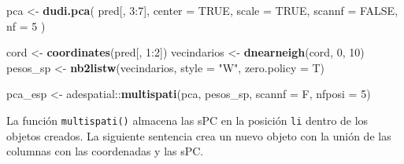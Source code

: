 \documentclass[11pt,b5paper,]{krantz}
\newenvironment{Shaded}{}{}
\newcommand{\CommentTok}[1]{\textcolor[rgb]{0.38,0.63,0.69}{\textit{#1}}}
\newcommand{\DataTypeTok}[1]{\textcolor[rgb]{0.56,0.13,0.00}{#1}}
\newcommand{\DecValTok}[1]{\textcolor[rgb]{0.25,0.63,0.44}{#1}}
\newcommand{\KeywordTok}[1]{\textcolor[rgb]{0.00,0.44,0.13}{\textbf{#1}}}
\newcommand{\NormalTok}[1]{#1}
\newcommand{\OperatorTok}[1]{\textcolor[rgb]{0.40,0.40,0.40}{#1}}
\newcommand{\OtherTok}[1]{\textcolor[rgb]{0.00,0.44,0.13}{#1}}
\newcommand{\StringTok}[1]{\textcolor[rgb]{0.25,0.44,0.63}{#1}}
\begin{document}
\begin{Shaded}
\begin{Highlighting}[]
\NormalTok{pca <-}
\StringTok{  }\KeywordTok{dudi.pca}\NormalTok{(}
\NormalTok{    pred[, }\DecValTok{3}\OperatorTok{:}\DecValTok{7}\NormalTok{],}
    \DataTypeTok{center =} \OtherTok{TRUE}\NormalTok{,}
    \DataTypeTok{scale =} \OtherTok{TRUE}\NormalTok{,}
    \DataTypeTok{scannf =} \OtherTok{FALSE}\NormalTok{,}
    \DataTypeTok{nf =} \DecValTok{5}
\NormalTok{  )}

\NormalTok{cord <-}\StringTok{ }\KeywordTok{coordinates}\NormalTok{(pred[, }\DecValTok{1}\OperatorTok{:}\DecValTok{2}\NormalTok{])}
\NormalTok{vecindarios <-}\StringTok{ }\KeywordTok{dnearneigh}\NormalTok{(cord, }\DecValTok{0}\NormalTok{, }\DecValTok{10}\NormalTok{)}
\NormalTok{pesos_sp <-}\StringTok{ }\KeywordTok{nb2listw}\NormalTok{(vecindarios, }
                     \DataTypeTok{style =} \StringTok{"W"}\NormalTok{, }
                     \DataTypeTok{zero.policy =}\NormalTok{ T)}

\NormalTok{pca_esp <-}
\StringTok{  }\NormalTok{adespatial}\OperatorTok{::}\KeywordTok{multispati}\NormalTok{(pca, pesos_sp, }
                         \DataTypeTok{scannf =}\NormalTok{ F, }\DataTypeTok{nfposi =} \DecValTok{5}\NormalTok{)}
\end{Highlighting}
\end{Shaded}

La función \texttt{multispati()} almacena las sPC en la posición \texttt{li} dentro de los objetos creados. La siguiente sentencia crea un nuevo objeto con la unión de las columnas con las coordenadas y las sPC.

\begin{Shaded}
\end{Shaded}
\end{document}
